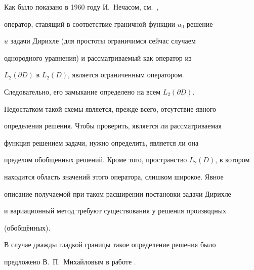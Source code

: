 Как было показано в 1960 году И.~Нечасом, см.~\cite{gushin:Nech},

оператор, ставящий в соответствие граничной функции $u_0$ решение

$u$ задачи Дирихле (для простоты ограничимся сейчас случаем

однородного уравнения) и рассматриваемый как оператор из

$L_2(\partial D)$ в $L_2(D)$, является ограниченным оператором.

Следовательно, его замыкание определено на всем $L_2(\partial D)$.

Недостатком такой схемы является, прежде всего, отсутствие явного

определения решения. Чтобы проверить, является ли рассматриваемая

функция решением задачи, нужно определить, является ли она

пределом обобщенных решений. Кроме того, пространство $L_2(D)$, в котором

находится область значений этого оператора, слишком широкое. Явное

описание получаемой при таком расширении постановки задачи Дирихле

и вариационный метод требуют существования у решения производных

(обобщённых).



В случае дважды гладкой границы такое определение решения было

предложено В.~П.~Михайловым в работе \cite{gushin:M76}.



\smallskip



